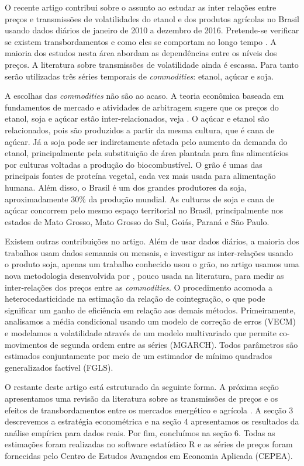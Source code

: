 O recente artigo contribui sobre o assunto ao estudar as inter relações  entre preços e transmissões de volatilidades do etanol e dos produtos agrícolas no Brasil usando dados diários de janeiro de 2010 a dezembro de 2016. Pretende-se verificar se existem transbordamentos e como eles se comportam ao longo tempo . A maioria dos estudos nesta área abordam as dependências entre os níveis dos preços. A literatura sobre transmissões de volatilidade ainda é escassa. Para tanto serão utilizadas três séries temporais de \emph{commodities}: etanol, açúcar e soja. 

A escolhas das \emph{commodities} não são ao acaso. A teoria econômica baseada em fundamentos de mercado e atividades de arbitragem sugere que os preços do etanol, soja e açúcar estão inter-relacionados, veja . O açúcar e etanol são relacionados, pois são produzidos a partir da mesma cultura, que é cana de açúcar. Já a soja pode ser indiretamente  afetada pelo aumento da demanda do etanol, principalmente pela substituição de área plantada para fins alimentícios por culturas voltadas a produção do biocombustível.  O grão é umas das principais fontes de proteína vegetal, cada vez mais usada para alimentação humana.  Além disso, o Brasil é um dos grandes produtores da soja, aproximadamente 30\% da produção mundial. As culturas de soja e cana de açúcar  concorrem pelo mesmo espaço territorial no Brasil, principalmente nos estados de Mato Grosso, Mato Grosso do Sul, Goiás, Paraná e São Paulo. 

Existem outras contribuições no artigo. Além de usar dados diários, a maioria dos trabalhos usam dados semanais ou mensais, e investigar as inter-relações usando o produto soja, apenas um trabalho conhecido usou o grão, no artigo usamos uma nova metodologia desenvolvida  por  , pouco usada na literatura, para medir as inter-relações dos preços entre as \emph{commodities}. O procedimento  acomoda a heterocedasticidade na estimação da relação de cointegração, o que pode significar um ganho de eficiência em relação aos demais métodos. Primeiramente,  analisamos a média condicional usando um modelo de correção de erros (VECM) e modelamos a  volatilidade através de um modelo multivariado que permite co-movimentos de segunda ordem entre as séries (MGARCH).  Todos parâmetros  são estimados conjuntamente por meio de um estimador de mínimo quadrados generalizados factível (FGLS).

O restante deste artigo está estruturado da seguinte forma. A próxima seção apresentamos uma revisão da literatura sobre as transmissões de preços e os efeitos de transbordamentos entre os mercados energético e agrícola . A secção 3 descrevemos  a estratégia econométrica e na seção 4 apresentamos os resultados da análise empírica para dados reais. Por fim, concluímos na seção 6. Todas as estimações foram realizadas no software estatístico R e as séries de preços foram fornecidas pelo Centro de Estudos Avançados em Economia Aplicada (CEPEA).
